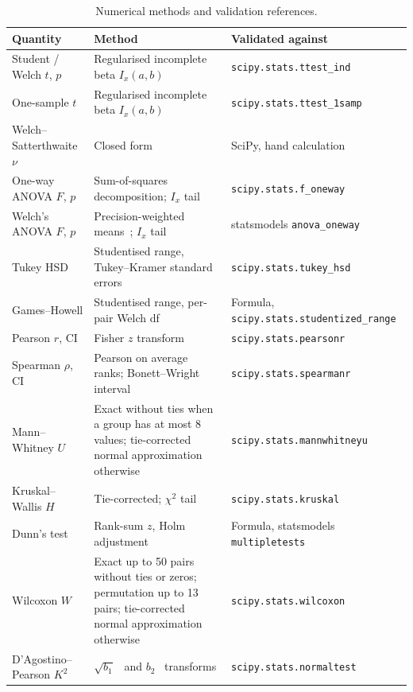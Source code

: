 \documentclass[11pt,a4paper]{article}
\begin{document}
\begin{table}[htbp]
\centering
\caption{Numerical methods and validation references.}
\label{tab:methods}
\footnotesize
\begin{tabular}{@{}>{\raggedright\arraybackslash}p{3.3cm}>{\raggedright\arraybackslash}p{5.0cm}>{\raggedright\arraybackslash}p{4.5cm}@{}}
\toprule
\textbf{Quantity} & \textbf{Method} & \textbf{Validated against} \\
\midrule
Student / Welch $t$, $p$ &
  Regularised incomplete beta $I_x(a,b)$ &
  \texttt{scipy.stats.ttest\_ind} \\
One-sample $t$ &
  Regularised incomplete beta $I_x(a,b)$ &
  \texttt{scipy.stats.\allowbreak{}ttest\_1samp} \\
Welch--Satterthwaite $\nu$ &
  Closed form &
  SciPy, hand calculation \\
One-way ANOVA $F$, $p$ &
  Sum-of-squares decomposition; $I_x$ tail &
  \texttt{scipy.stats.f\_oneway} \\
Welch's ANOVA $F$, $p$ &
  Precision-weighted means~\cite{welch1951}; $I_x$ tail &
  statsmodels \texttt{anova\_oneway} \\
Tukey HSD &
  Studentised range, Tukey--Kramer standard errors &
  \texttt{scipy.stats.tukey\_hsd} \\
Games--Howell &
  Studentised range, per-pair Welch df &
  Formula, \texttt{scipy.stats.\allowbreak{}studentized\_range} \\
Pearson $r$, CI &
  Fisher $z$ transform &
  \texttt{scipy.stats.pearsonr} \\
Spearman $\rho$, CI &
  Pearson on average ranks; Bonett--Wright interval~\cite{bonett2000} &
  \texttt{scipy.stats.spearmanr} \\
Mann--Whitney $U$ &
  Exact without ties when a group has at most 8 values; tie-corrected normal approximation otherwise &
  \texttt{scipy.stats.\allowbreak{}mannwhitneyu} \\
Kruskal--Wallis $H$ &
  Tie-corrected; $\chi^2$ tail &
  \texttt{scipy.stats.kruskal} \\
Dunn's test &
  Rank-sum $z$, Holm adjustment &
  Formula, statsmodels \texttt{multipletests} \\
Wilcoxon $W$ &
  Exact up to 50 pairs without ties or zeros; permutation up to 13 pairs; tie-corrected normal approximation otherwise &
  \texttt{scipy.stats.wilcoxon} \\
D'Agostino--Pearson $K^2$ &
  $\sqrt{b_1}$~\cite{dagostino1970} and
  $b_2$~\cite{anscombe1983} transforms &
  \texttt{scipy.stats.normaltest} \\

\end{tabular}
\end{table}
\end{document}
